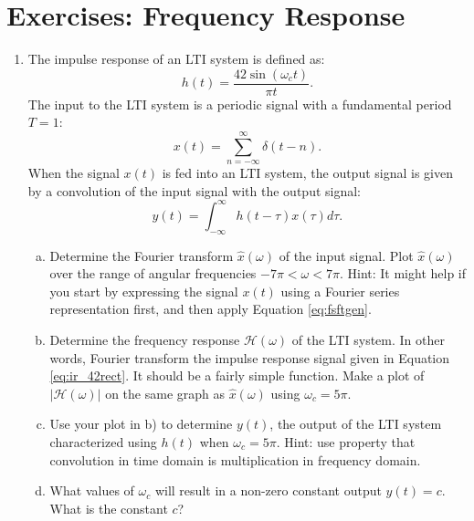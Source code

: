 \newpage
\section{Exercises: Frequency Response}

\begin{enumerate}

\item The impulse response of an LTI system is defined as:
\begin{equation}
    h(t) = \frac{42\sin(\omega_c t)}{\pi t}.
    \label{eq:ir_42rect}
\end{equation}
The input to the LTI system is a periodic signal with a fundamental period $T=1$:
\begin{equation}
    x(t) = \sum_{n=-\infty}^{\infty}\delta(t-n).
\end{equation}
When the signal $x(t)$ is fed into an LTI system, the output signal is given by a convolution of the input signal with the output signal:
\begin{equation}
    y(t) = \int_{-\infty}^{\infty} h(t-\tau)x(\tau) d\tau.
\end{equation}
\begin{enumerate}[a)]
\item Determine the Fourier transform $\hat{x}(\omega)$ of the input signal. Plot $\hat{x}(\omega)$ over the range of angular frequencies $-7\pi < \omega < 7\pi$. Hint: It might help if you start by expressing the signal $x(t)$ using a Fourier series representation first, and then apply Equation \ref{eq:fsftgen}.
\item Determine the frequency response $\mathcal{H}(\omega)$ of the LTI system. In other words, Fourier transform the impulse response signal given in Equation \ref{eq:ir_42rect}. It should be a fairly simple function. Make a plot of $|\mathcal{H}(\omega)|$ on the same graph as $\hat{x}(\omega)$ using $\omega_c = 5\pi$.
\item Use your plot in b) to determine $y(t)$, the output of the LTI system characterized using $h(t)$ when $\omega_c=5\pi$. Hint: use property that convolution in time domain is multiplication in frequency domain.
\item What values of $\omega_c$ will result in a non-zero constant output $y(t)=c$. What is the constant $c$?
\end{enumerate}


\end{enumerate}
